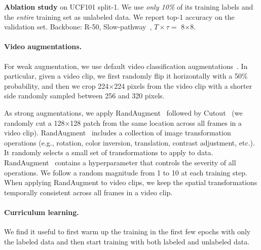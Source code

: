 \documentclass[10pt,twocolumn,letterpaper]{article}
\def\x{$\times$}
\begin{document}
\begin{table*}[t]
	\caption{\textbf{Ablation study} on UCF101 split-1. We use \textit{only 10\%} of its training labels and the \textit{entire} training set as unlabeled data. We report top-1 accuracy on the validation set. Backbone: R-50, Slow-pathway~\cite{feichtenhofer2019slowfast}, $T\times\tau=$ 8\x 8. }
	\vspace{-5pt}
	\label{tab:ablations}
\end{table*}



\paragraph{Video augmentations.} For weak augmentation, we use default video classification augmentations~\cite{feichtenhofer2019slowfast}. In particular, given a video clip, we first randomly flip it horizontally with a 50\% probability, and then we crop 224$\times$224 pixels from the video clip with a shorter side randomly sampled between 256 and 320 pixels.

As strong augmentations, we apply RandAugment~\cite{randaug} followed by Cutout~\cite{cutout} (we randomly cut a 128$\times$128 patch from the same location across all frames in a video clip). RandAugment~\cite{randaug} includes a collection of image transformation operations (e.g., rotation, color inversion, translation, contrast adjustment, etc.). It randomly selects a small set of transformations to apply to data. 
RandAugment~\cite{randaug} contains a hyperparameter  that controls the severity of all operations. We follow a random magnitude from 1 to 10 at each training step.
When applying RandAugment to video clips, we keep the spatial transformations temporally consistent across all frames in a video clip. 


\paragraph{Curriculum learning.} We find it useful to first warm up the training in the first few epochs with only the labeled data and then start training with both labeled and unlabeled data.
\end{document}
